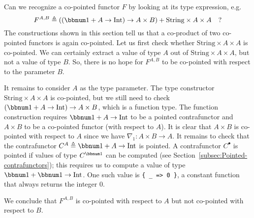 Can we recognize a co-pointed functor $F$ by looking at its type
expression, e.g.
\[
F^{A,B}\triangleq\left(\left(\bbnum 1+A\rightarrow\text{Int}\right)\rightarrow A\times B\right)+\text{String}\times A\times A\quad?
\]
The constructions shown in this section tell us that a co-product
of two co-pointed functors is again co-pointed. Let us first check
whether $\text{String}\times A\times A$ is co-pointed. We can certainly
extract a value of type $A$ out of $\text{String}\times A\times A$,
but not a value of type $B$. So, there is no hope for $F^{A,B}$
to be co-pointed with respect to the parameter $B$.

It remains to consider $A$ as the type parameter. The type constructor
$\text{String}\times A\times A$ is co-pointed, but we still need
to check $\left(\bbnum 1+A\rightarrow\text{Int}\right)\rightarrow A\times B$,
which is a function type. The function construction requires $\bbnum 1+A\rightarrow\text{Int}$
to be a pointed contrafunctor and $A\times B$ to be a co-pointed
functor (with respect to $A$). It is clear that $A\times B$ is co-pointed
with respect to $A$ since we have $\nabla_{1}:A\times B\rightarrow A$.
It remains to check that the contrafunctor $C^{A}\triangleq\bbnum 1+A\rightarrow\text{Int}$
is pointed. A contrafunctor $C^{\bullet}$ is pointed if values of
type $C^{\bbnum 1}$ can be computed (see Section~\ref{subsec:Pointed-contrafunctors});
this requires us to compute a value of type $\bbnum 1+\bbnum 1\rightarrow\text{Int}$.
One such value is \lstinline!{ _ => 0 }!, a constant function that
always returns the integer $0$. 

We conclude that $F^{A,B}$ is co-pointed with respect to $A$ but
not co-pointed with respect to $B$.

